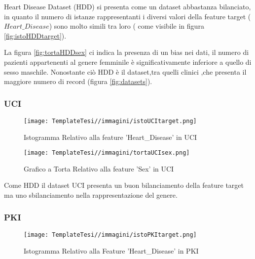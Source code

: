 \begin{flushleft}
    
Heart Disease Dataset (HDD) si presenta come un dataset abbastanza bilanciato, in quanto il numero di istanze rappresentanti i diversi valori della feature target  ($Heart\_Disease$) sono molto simili tra loro ( come visibile in figura \ref{fig:istoHDDtarget}).

La figura \ref{fig:tortaHDDsex} ci indica  la presenza di un bias nei dati, il numero di pazienti appartenenti al genere femminile è significativamente inferiore a quello di sesso maschile.
Nonostante ciò HDD è il dataset,tra quelli  clinici ,che presenta il maggiore numero di record (figura \ref{fig:datasets}).

\subsubsection{UCI}

\begin{figure}[H]
    \centering
    \texttt{[image: TemplateTesi//immagini/istoUCItarget.png]}
    \caption{Istogramma Relativo alla feature 'Heart\_Disease' in UCI}
    \label{fig:istoUCItarget}
\end{figure}
\begin{figure}[H]
    \centering
    \texttt{[image: TemplateTesi//immagini/tortaUCIsex.png]}
    \caption{Grafico a Torta Relativo alla feature 'Sex' in UCI}
    \label{fig:tortaUCIsex}
\end{figure}
Come HDD il dataset UCI presenta un buon bilanciamento della feature target ma uno sbilanciamento nella rappresentazione del genere.

\subsubsection{PKI}


  \begin{figure}[H]
    \centering
    \texttt{[image: TemplateTesi//immagini/istoPKItarget.png]}
    \caption{Istogramma Relativo alla Feature 'Heart\_Disease' in PKI}
    \label{fig:istoPKItarget}
\end{figure}


\end{flushleft}
